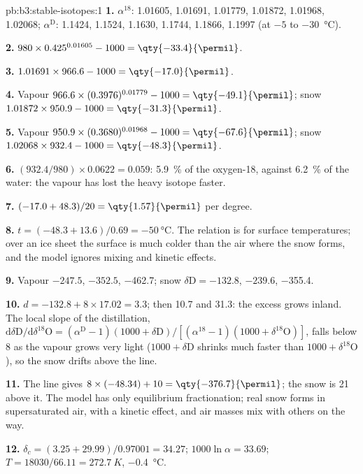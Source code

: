 \begin{solution}{pb:b3:stable-isotopes:1}
\textbf{1.} $\alpha^{18}$: 1.01605, 1.01691, 1.01779, 1.01872, 1.01968,
1.02068; $\alpha^{\mathrm D}$: 1.1424, 1.1524, 1.1630, 1.1744, 1.1866, 1.1997
(at $-5$ to \qty{-30}{\celsius}).

\textbf{2.} $980\times0.425^{0.01605} - 1000 = \qty{-33.4}{\permil}$.

\textbf{3.} $1.01691\times966.6 - 1000 = \qty{-17.0}{\permil}$.

\textbf{4.} Vapour $966.6\times(0.3976)^{0.01779} - 1000 = \qty{-49.1}{\permil}$;
snow $1.01872\times950.9 - 1000 = \qty{-31.3}{\permil}$.

\textbf{5.} Vapour $950.9\times(0.3680)^{0.01968} - 1000 = \qty{-67.6}{\permil}$;
snow $1.02068\times932.4 - 1000 = \qty{-48.3}{\permil}$.

\textbf{6.} $(932.4/980)\times0.0622 = 0.059$: \qty{5.9}{\percent} of the
oxygen-18, against \qty{6.2}{\percent} of the water: the vapour has lost the
heavy isotope faster.

\textbf{7.} $(-17.0 + 48.3)/20 = \qty{1.57}{\permil}$ per degree.

\textbf{8.} $t = (-48.3 + 13.6)/0.69 = \qty{-50}{\celsius}$. The relation is
for surface temperatures; over an ice sheet the surface is much colder than the
air where the snow forms, and the model ignores mixing and kinetic effects.

\textbf{9.} Vapour $-247.5$, $-352.5$, \qty{-462.7}{\permil}; snow $\delta\mathrm D
= -132.8$, $-239.6$, \qty{-355.4}{\permil}.

\textbf{10.} $d = -132.8 + 8\times17.02 = 3.3$; then 10.7 and
\qty{31.3}{\permil}: the excess grows inland. The local slope of the
distillation, $\mathrm d\delta\mathrm D/\mathrm d\delta^{18}\mathrm O = (\alpha^{\mathrm D} -
1)(1000 + \delta\mathrm D)/[(\alpha^{18} - 1)(1000 + \delta^{18}\mathrm O)]$, falls below
8 as the vapour grows very light ($1000 + \delta\mathrm D$ shrinks much faster than
$1000 + \delta^{18}\mathrm O$), so the snow drifts above the line.

\textbf{11.} The line gives $8\times(-48.34) + 10 = \qty{-376.7}{\permil}$; the
snow is \qty{21}{\permil} above it. The model has only equilibrium
fractionation; real snow forms in supersaturated air, with a kinetic effect,
and air masses mix with others on the way.

\textbf{12.} $\delta_c = (3.25 + 29.99)/0.97001 = 34.27$; $1000\ln\alpha =
33.69$; $T = 18030/66.11 = \qty{272.7}{K}$, \qty{-0.4}{\celsius}.


\end{solution}
